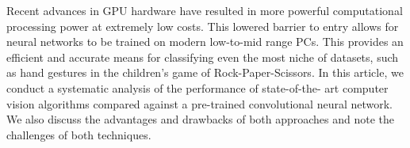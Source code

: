 Recent advances in GPU hardware have resulted in more powerful computational
processing power at extremely low costs. This lowered barrier to entry allows
for neural networks to be trained on modern low-to-mid range PCs. This provides
an efficient and accurate means for classifying even the most niche of datasets,
such as hand gestures in the children's game of Rock-Paper-Scissors. In this
article, we conduct a systematic analysis of the performance of state-of-the-
art computer vision algorithms compared against a pre-trained convolutional
neural network. We also discuss the advantages and drawbacks of both approaches
and note the challenges of both techniques.